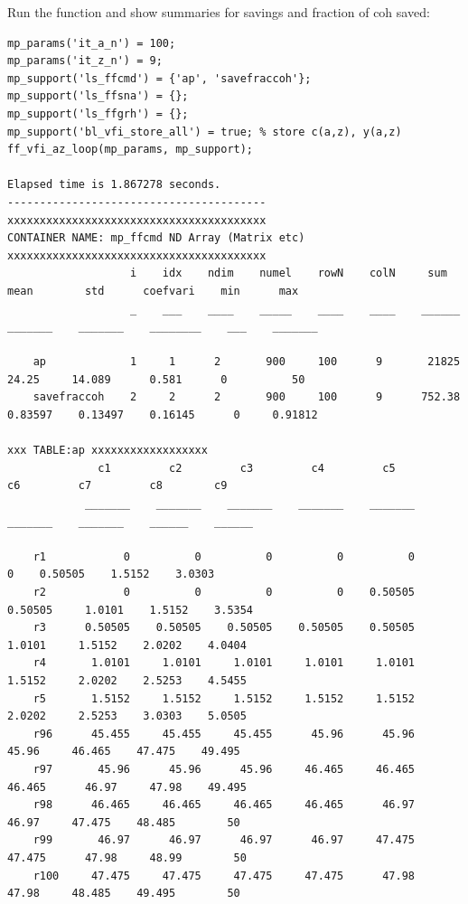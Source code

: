 \documentclass[
]{book}
\begin{document}
Run the function and show summaries for savings and fraction of coh
saved:

\begin{verbatim}
mp_params('it_a_n') = 100;
mp_params('it_z_n') = 9;
mp_support('ls_ffcmd') = {'ap', 'savefraccoh'};
mp_support('ls_ffsna') = {};
mp_support('ls_ffgrh') = {};
mp_support('bl_vfi_store_all') = true; % store c(a,z), y(a,z)
ff_vfi_az_loop(mp_params, mp_support);

Elapsed time is 1.867278 seconds.
----------------------------------------
xxxxxxxxxxxxxxxxxxxxxxxxxxxxxxxxxxxxxxxx
CONTAINER NAME: mp_ffcmd ND Array (Matrix etc)
xxxxxxxxxxxxxxxxxxxxxxxxxxxxxxxxxxxxxxxx
                   i    idx    ndim    numel    rowN    colN     sum       mean        std      coefvari    min      max  
                   _    ___    ____    _____    ____    ____    ______    _______    _______    ________    ___    _______

    ap             1     1      2       900     100      9       21825      24.25     14.089      0.581      0          50
    savefraccoh    2     2      2       900     100      9      752.38    0.83597    0.13497    0.16145      0     0.91812

xxx TABLE:ap xxxxxxxxxxxxxxxxxx
              c1         c2         c3         c4         c5         c6         c7         c8        c9  
            _______    _______    _______    _______    _______    _______    _______    ______    ______

    r1            0          0          0          0          0          0    0.50505    1.5152    3.0303
    r2            0          0          0          0    0.50505    0.50505     1.0101    1.5152    3.5354
    r3      0.50505    0.50505    0.50505    0.50505    0.50505     1.0101     1.5152    2.0202    4.0404
    r4       1.0101     1.0101     1.0101     1.0101     1.0101     1.5152     2.0202    2.5253    4.5455
    r5       1.5152     1.5152     1.5152     1.5152     1.5152     2.0202     2.5253    3.0303    5.0505
    r96      45.455     45.455     45.455      45.96      45.96      45.96     46.465    47.475    49.495
    r97       45.96      45.96      45.96     46.465     46.465     46.465      46.97     47.98    49.495
    r98      46.465     46.465     46.465     46.465      46.97      46.97     47.475    48.485        50
    r99       46.97      46.97      46.97      46.97     47.475     47.475      47.98     48.99        50
    r100     47.475     47.475     47.475     47.475      47.98      47.98     48.485    49.495        50


\end{verbatim}
\end{document}
